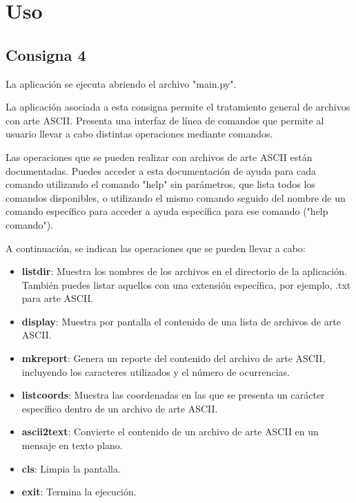 \documentclass[a4paper,12pt]{article}
\begin{document}
\section{Uso}

\subsection{Consigna 4}
La aplicación se ejecuta abriendo el archivo "main.py".

La aplicación asociada a esta consigna permite el tratamiento general de archivos con arte ASCII. Presenta una interfaz de línea de comandos que permite al usuario llevar a cabo distintas operaciones mediante comandos.

Las operaciones que se pueden realizar con archivos de arte ASCII están documentadas. Puedes acceder a esta documentación de ayuda para cada comando utilizando el comando "help" sin parámetros, que lista todos los comandos disponibles, o utilizando el mismo comando seguido del nombre de un comando específico para acceder a ayuda específica para ese comando ("help comando").

A continuación, se indican las operaciones que se pueden llevar a cabo:

\begin{itemize}
    \item \textbf{listdir}: Muestra los nombres de los archivos en el directorio de la aplicación. También puedes listar aquellos con una extensión específica, por ejemplo, .txt para arte ASCII.
    \item \textbf{display}: Muestra por pantalla el contenido de una lista de archivos de arte ASCII.
    \item \textbf{mkreport}: Genera un reporte del contenido del archivo de arte ASCII, incluyendo los caracteres utilizados y el número de ocurrencias.
    \item \textbf{listcoords}: Muestra las coordenadas en las que se presenta un carácter específico dentro de un archivo de arte ASCII.
    \item \textbf{ascii2text}: Convierte el contenido de un archivo de arte ASCII en un mensaje en texto plano.
    \item \textbf{cls}: Limpia la pantalla.
    \item \textbf{exit}: Termina la ejecución.
\end{itemize}
\end{document}
